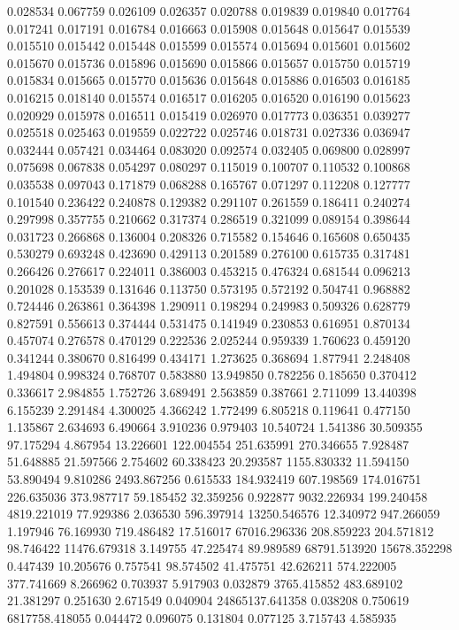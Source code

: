 0.028534
0.067759
0.026109
0.026357
0.020788
0.019839
0.019840
0.017764
0.017241
0.017191
0.016784
0.016663
0.015908
0.015648
0.015647
0.015539
0.015510
0.015442
0.015448
0.015599
0.015574
0.015694
0.015601
0.015602
0.015670
0.015736
0.015896
0.015690
0.015866
0.015657
0.015750
0.015719
0.015834
0.015665
0.015770
0.015636
0.015648
0.015886
0.016503
0.016185
0.016215
0.018140
0.015574
0.016517
0.016205
0.016520
0.016190
0.015623
0.020929
0.015978
0.016511
0.015419
0.026970
0.017773
0.036351
0.039277
0.025518
0.025463
0.019559
0.022722
0.025746
0.018731
0.027336
0.036947
0.032444
0.057421
0.034464
0.083020
0.092574
0.032405
0.069800
0.028997
0.075698
0.067838
0.054297
0.080297
0.115019
0.100707
0.110532
0.100868
0.035538
0.097043
0.171879
0.068288
0.165767
0.071297
0.112208
0.127777
0.101540
0.236422
0.240878
0.129382
0.291107
0.261559
0.186411
0.240274
0.297998
0.357755
0.210662
0.317374
0.286519
0.321099
0.089154
0.398644
0.031723
0.266868
0.136004
0.208326
0.715582
0.154646
0.165608
0.650435
0.530279
0.693248
0.423690
0.429113
0.201589
0.276100
0.615735
0.317481
0.266426
0.276617
0.224011
0.386003
0.453215
0.476324
0.681544
0.096213
0.201028
0.153539
0.131646
0.113750
0.573195
0.572192
0.504741
0.968882
0.724446
0.263861
0.364398
1.290911
0.198294
0.249983
0.509326
0.628779
0.827591
0.556613
0.374444
0.531475
0.141949
0.230853
0.616951
0.870134
0.457074
0.276578
0.470129
0.222536
2.025244
0.959339
1.760623
0.459120
0.341244
0.380670
0.816499
0.434171
1.273625
0.368694
1.877941
2.248408
1.494804
0.998324
0.768707
0.583880
13.949850
0.782256
0.185650
0.370412
0.336617
2.984855
1.752726
3.689491
2.563859
0.387661
2.711099
13.440398
6.155239
2.291484
4.300025
4.366242
1.772499
6.805218
0.119641
0.477150
1.135867
2.634693
6.490664
3.910236
0.979403
10.540724
1.541386
30.509355
97.175294
4.867954
13.226601
122.004554
251.635991
270.346655
7.928487
51.648885
21.597566
2.754602
60.338423
20.293587
1155.830332
11.594150
53.890494
9.810286
2493.867256
0.615533
184.932419
607.198569
174.016751
226.635036
373.987717
59.185452
32.359256
0.922877
9032.226934
199.240458
4819.221019
77.929386
2.036530
596.397914
13250.546576
12.340972
947.266059
1.197946
76.169930
719.486482
17.516017
67016.296336
208.859223
204.571812
98.746422
11476.679318
3.149755
47.225474
89.989589
68791.513920
15678.352298
0.447439
10.205676
0.757541
98.574502
41.475751
42.626211
574.222005
377.741669
8.266962
0.703937
5.917903
0.032879
3765.415852
483.689102
21.381297
0.251630
2.671549
0.040904
24865137.641358
0.038208
0.750619
6817758.418055
0.044472
0.096075
0.131804
0.077125
3.715743
4.585935
